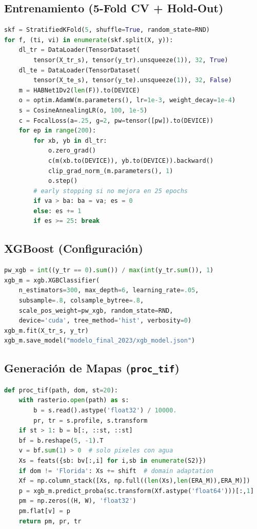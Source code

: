 \documentclass[12pt]{article}
\begin{document}
\subsection{Entrenamiento (5-Fold CV + Hold-Out)}
\begin{lstlisting}[language=Python]
skf = StratifiedKFold(5, shuffle=True, random_state=RND)
for f, (ti, vi) in enumerate(skf.split(X, y)):
    dl_tr = DataLoader(TensorDataset(
        tensor(X_tr_s), tensor(y_tr).unsqueeze(1)), 32, True)
    dl_te = DataLoader(TensorDataset(
        tensor(X_te_s), tensor(y_te).unsqueeze(1)), 32, False)
    m = HABNet1Dv2(len(F)).to(DEVICE)
    o = optim.AdamW(m.parameters(), lr=1e-3, weight_decay=1e-4)
    s = CosineAnnealingLR(o, 100, 1e-5)
    c = FocalLoss(a=.25, g=2, pw=tensor([pw]).to(DEVICE))
    for ep in range(200):
        for xb, yb in dl_tr:
            o.zero_grad()
            c(m(xb.to(DEVICE)), yb.to(DEVICE)).backward()
            clip_grad_norm_(m.parameters(), 1)
            o.step()
        # early stopping si no mejora en 25 epochs
        if va > ba: ba = va; es = 0
        else: es += 1
        if es >= 25: break
\end{lstlisting}

\subsection{XGBoost (Configuraci\'on)}
\begin{lstlisting}[language=Python]
pw_xgb = int((y_tr == 0).sum()) / max(int(y_tr.sum()), 1)
xgb_m = xgb.XGBClassifier(
    n_estimators=300, max_depth=6, learning_rate=.05,
    subsample=.8, colsample_bytree=.8,
    scale_pos_weight=pw_xgb, random_state=RND,
    device='cuda', tree_method='hist', verbosity=0)
xgb_m.fit(X_tr_s, y_tr)
xgb_m.save_model("modelo_final_2023/xgb_model.json")
\end{lstlisting}

\subsection{Generaci\'on de Mapas (\texttt{proc\_tif})}
\begin{lstlisting}[language=Python]
def proc_tif(path, dom, st=20):
    with rasterio.open(path) as s:
        b = s.read().astype('float32') / 10000.
        pr, tr = s.profile, s.transform
    if st > 1: b = b[:, ::st, ::st]
    bf = b.reshape(5, -1).T
    v = bf.sum(1) > 0  # solo pixeles con agua
    Xs = feats({sb: bv[:,i] for i,sb in enumerate(S2)})
    if dom != 'Florida': Xs += shift  # domain adaptation
    Xf = np.column_stack([Xs, np.full((len(Xs),len(ERA_M)),ERA_M)])
    p = xgb_m.predict_proba(sc.transform(Xf.astype('float64')))[:,1]
    pm = np.zeros((H, W), 'float32')
    pm.flat[v] = p
    return pm, pr, tr
\end{lstlisting}
\end{document}

